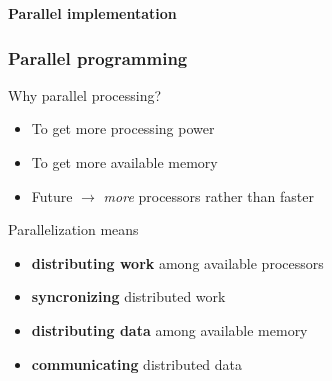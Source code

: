 \begin{frame}
    \centering
    \textbf{\Large{Parallel implementation}}
\end{frame}

\begin{frame}
    \frametitle{Parallel programming}
    Why parallel processing?
    \begin{itemize}
	\item	To get more processing power
	\item	To get more available memory
	\item	Future $\rightarrow$ \emph{more} processors rather than faster
    \end{itemize}

    \vspace{5mm}

    \pause
    Parallelization means
    \begin{itemize}
	\item	\textbf{distributing work} among available processors
	\item	\textbf{syncronizing} distributed work
	\item	\textbf{distributing data} among available memory
	\item	\textbf{communicating} distributed data
    \end{itemize}
\end{frame}

